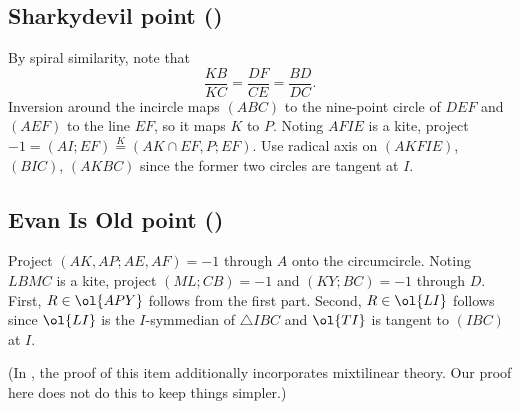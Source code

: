 \documentclass[11pt]{scrartcl}
\begin{document}
\subsection{Sharkydevil point ()}
\begin{enumerate}
  \ii By spiral similarity, note that \[ \frac{KB}{KC} = \frac{DF}{CE} = \frac{BD}{DC}. \]
  \ii Inversion around the incircle maps $(ABC)$ to the nine-point circle of $DEF$
  and $(AEF)$ to the line $EF$, so it maps $K$ to $P$.
  \ii Noting $AFIE$ is a kite, project $-1 = (AI;EF) \overset{K}{=} (AK \cap EF, P; EF)$.
  \ii Use radical axis on $(AKFIE)$, $(BIC)$, $(AKBC)$
  since the former two circles are tangent at $I$.
\end{enumerate}

\subsection{Evan Is Old point ()}
\begin{enumerate}
  \ii Project $(AK,AP;AE,AF) = -1$ through $A$ onto the circumcircle.
  \ii Noting $LBMC$ is a kite, project $(ML;CB) = -1$ and $(KY;BC) = -1$ through $D$.
  \ii First, $R \in \ol{APY}$ follows from the first part.
  Second, $R \in \ol{LI}$ follows since $\ol{LI}$ is the $I$-symmedian of $\triangle IBC$
  and $\ol{TI}$ is tangent to $(IBC)$ at $I$.

  (In \cite{M21}, the proof of this item additionally incorporates mixtilinear theory.
  Our proof here does not do this to keep things simpler.)
\end{enumerate}
\end{document}
